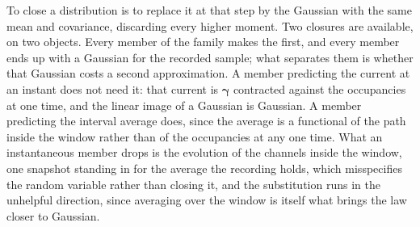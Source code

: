 To close a distribution is to replace it at that step by the Gaussian with the same mean and
covariance, discarding every higher moment. Two closures are available, on two objects. Every member of the family makes the first, and every member ends up with a Gaussian for the
recorded sample; what separates them is whether that Gaussian costs a second approximation. A member predicting the current at an instant does not need
it: that current is $\bm{\gamma}$ contracted against the occupancies at one time, and the linear
image of a Gaussian is Gaussian. A member predicting the interval average does, since the average
is a functional of the path inside the window rather than of the occupancies at any one time. What
an instantaneous member drops is the evolution of the channels inside the window, one snapshot
standing in for the average the recording holds, which misspecifies the random variable rather than
closing it, and the substitution runs in the unhelpful direction, since averaging over the window is
itself what brings the law closer to Gaussian.

